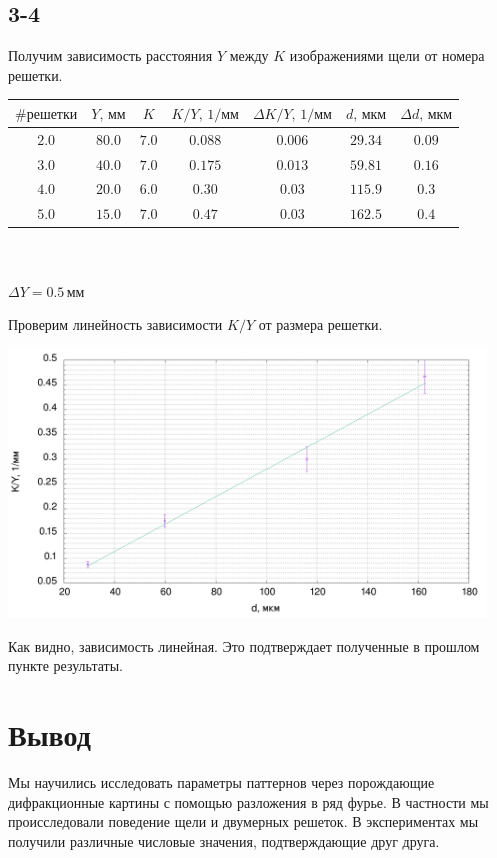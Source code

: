 \subsection*{3-4}
Получим зависимость расстояния $Y$ между $K$ изображениями щели от номера решетки.

\begin{center}
\begin{tabular}{|c|c|c|c|c|c|c|}\hline
$\text{\#решетки}$&$Y\text{, мм}$&$K$&$K/Y\text{, 1/мм}$&$\Delta K/Y\text{, 1/мм}$&$d\text{, мкм}$&$\Delta d\text{, мкм}$\\\hline
$2.0$&$80.0$&$7.0$&$0.088$&$0.006$&$29.34$&$0.09$\\\hline
$3.0$&$40.0$&$7.0$&$0.175$&$0.013$&$59.81$&$0.16$\\\hline
$4.0$&$20.0$&$6.0$&$0.30$&$0.03$&$115.9$&$0.3$\\\hline
$5.0$&$15.0$&$7.0$&$0.47$&$0.03$&$162.5$&$0.4$\\\hline
\end{tabular}\\~\\
$\Delta Y=0.5\,\text{мм}$
\end{center}

Проверим линейность зависимости $K/Y$ от размера решетки.

\begin{center}
\includegraphics[width=0.95\textwidth]{plot3.png}
\end{center}

Как видно, зависимость линейная. Это подтверждает полученные в прошлом пункте результаты.

\section*{Вывод}
Мы научились исследовать параметры паттернов через порождающие дифракционные картины с помощью разложения в ряд фурье. В частности мы происследовали поведение щели и двумерных решеток. В экспериментах мы получили различные числовые значения, подтверждающие друг друга.










